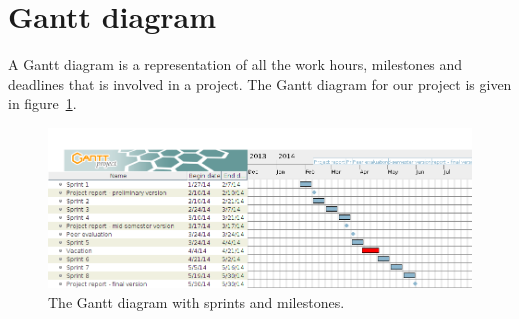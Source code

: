 \section{Gantt diagram}
\label{sec:gantt}

A Gantt diagram is a representation of all the work hours, milestones and deadlines that is involved in a project. The Gantt diagram for our project is given in figure~\ref{fig:gantt}.


\begin{figure}[H]
\includegraphics[width=\textwidth]{ch/planning/fig/gantt.png}
\caption{The Gantt diagram with sprints and milestones.}
\label{fig:gantt}
\end{figure}